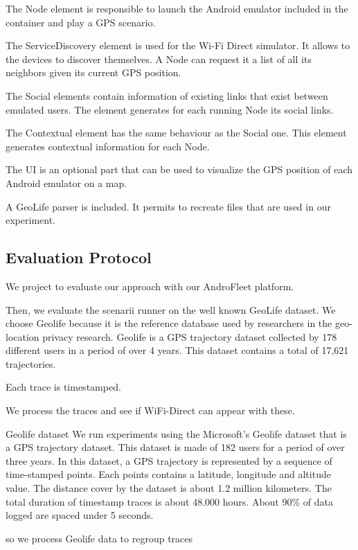 The Node element is responsible to launch the Android emulator included in the container and play a GPS scenario.

The ServiceDiscovery element is used for the Wi-Fi Direct simulator.
It allows to the devices to discover themselves.
A Node can request it a list of all its neighbors given its current GPS position.

The Social elements contain information of existing links that exist between emulated users.
The element generates for each running Node its social links.

The Contextual element has the same behaviour as the Social one.
This element generates contextual information for each Node.

The UI is an optional part that can be used to visualize the GPS position of each Android emulator on a map.

A GeoLife parser is included.
It permits to recreate files that are used in our experiment.

\subsection{Evaluation Protocol}



We project to evaluate our approach with our AndroFleet platform.




Then, we evaluate the scenarii runner on the well known GeoLife dataset.
We choose Geolife because it is the reference database used by researchers in the geo-location privacy research.
Geolife is a GPS trajectory dataset collected by 178 different users in a period of over 4 years. 
This dataset contains a total of 17,621 trajectories.

Each trace is timestamped.

We process the traces and see if WiFi-Direct can appear with these.

Geolife dataset
We run experiments using the Microsoft’s Geolife
dataset that is a GPS trajectory dataset.
This dataset is made of 182 users for a period of over three years.
In this dataset, a GPS trajectory is represented by a
sequence of time-stamped points.
Each points contains a latitude, longitude and altitude value.
The distance cover by the dataset is about 1.2 million kilometers.
The total duration of timestamp traces is about 48.000 hours.
About 90\% of data logged are spaced under 5 seconds.


so we process Geolife data to regroup traces 

